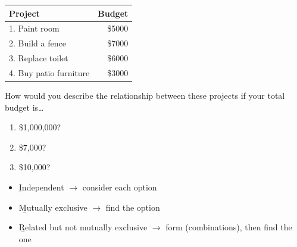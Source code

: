 \begin{example}
    \begin{center}
    \begin{tabular}{lr}
        \toprule
        Project & Budget \\
        \midrule
        1. Paint room & \$5000 \\
        2. Build a fence & \$7000 \\
        3. Replace toilet & \$6000 \\
        4. Buy patio furniture & \$3000 \\
        \bottomrule
    \end{tabular}
    \end{center}
    How would you describe the relationship between these projects if your
    total budget is\dots
    \begin{enumerate}[label = \alph*)]
        \item \$1,000,000?
        \\
        \item \$7,000?
        \\
        \item \$10,000?
        \\
    \end{enumerate}
\end{example}

\begin{itemize}
    \item \b{Independent} $\to$ consider each option 
    \item \b{Mutually exclusive} $\to$ find the  option
    \item \b{Related but not mutually exclusive} $\to$ form  (combinations), then find the  one
\end{itemize}


